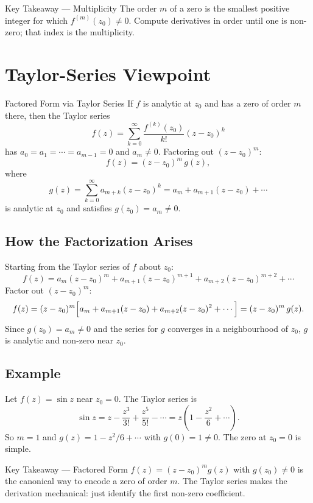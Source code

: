 \documentclass[12pt,a4paper]{article}
\begin{document}
\begin{learnbox}{Key Takeaway --- Multiplicity}
The order $m$ of a zero is the smallest positive integer for which $f^{(m)}(z_0)\neq 0$.
Compute derivatives in order until one is non-zero; that index is the multiplicity.
\end{learnbox}

\section{Taylor-Series Viewpoint}

\begin{infobox}{Factored Form via Taylor Series}
If $f$ is analytic at $z_0$ and has a zero of order $m$ there, then the Taylor series
\[
  f(z) = \sum_{k=0}^{\infty} \frac{f^{(k)}(z_0)}{k!}(z-z_0)^k
\]
has $a_0 = a_1 = \cdots = a_{m-1} = 0$ and $a_m \neq 0$. Factoring out $(z-z_0)^m$:
\[
  \boxed{f(z) = (z-z_0)^m \, g(z)},
\]
where
\[
  g(z) = \sum_{k=0}^{\infty} a_{m+k}(z-z_0)^k = a_m + a_{m+1}(z-z_0) + \cdots
\]
is analytic at $z_0$ and satisfies $g(z_0) = a_m \neq 0$.
\end{infobox}

\subsection*{How the Factorization Arises}

Starting from the Taylor series of $f$ about $z_0$:
\[
  f(z) = a_m(z-z_0)^m + a_{m+1}(z-z_0)^{m+1} + a_{m+2}(z-z_0)^{m+2} + \cdots
\]
Factor out $(z-z_0)^m$:
\[
  f(z) = (z-z_0)^m \Bigl[a_m + a_{m+1}(z-z_0) + a_{m+2}(z-z_0)^2 + \cdots \Bigr]
       = (z-z_0)^m \, g(z).
\]
Since $g(z_0) = a_m \neq 0$ and the series for $g$ converges in a neighbourhood of $z_0$,
$g$ is analytic and non-zero near $z_0$.

\subsection*{Example}

Let $f(z) = \sin z$ near $z_0 = 0$. The Taylor series is
\[
  \sin z = z - \frac{z^3}{3!} + \frac{z^5}{5!} - \cdots = z\left(1 - \frac{z^2}{6} + \cdots\right).
\]
So $m=1$ and $g(z) = 1 - z^2/6 + \cdots$ with $g(0)=1 \neq 0$. The zero at $z_0=0$ is simple.

\begin{learnbox}{Key Takeaway --- Factored Form}
$f(z)=(z-z_0)^m g(z)$ with $g(z_0)\neq 0$ is the canonical way to encode a zero of order $m$.
The Taylor series makes the derivation mechanical: just identify the first non-zero coefficient.
\end{learnbox}
\end{document}

